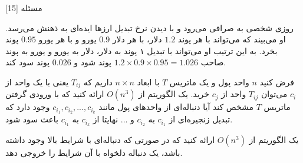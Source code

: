 ‌مسئله [15]

روزی شخصی به صرافی می‌رود و با دیدن نرخ تبدیل ارزها ایده‌ای به ذهنش می‌رسد. او می‌بیند که می‌تواند با هر پوند
$1.2$
دلار، با هر دلار
$0.9$
یورو و با هر یورو
$0.95$
پوند بخرد. به این ترتیب او می‌تواند با تبدیل ۱ پوند به دلار، دلار به یورو و یورو به پوند صاحب
$1.2 \times 0.9 \times 0.95 = 1.026$
پوند شود و 
$0.026$
پوند سود کند.

فرض کنید
$n$
واحد پول و یک ماتریس
$T$
با ابعاد
$n \times n$
داریم که 
$T_{ij}$
یعنی با یک واحد از $c_i$ می‌توان
$T_{ij}$
واحد از
$c_j$
خرید.
یک الگوریتم  از	
$O(n^3)$
ارائه کنید که با ورودی گرفتن ماتریس
$T$
مشخص کند آیا دنباله‌ای از واحدهای پول مانند
$c_{i_1}, c_{i_2}, ..., c_{i_k}$
وجود دارد که تبدیل زنجیره‌ای از
$c_{i_1}$ به $c_{i_2}$
و ...
نهایتا از
$c_{i_k}$ به $c_{i_1}$
باعث سود شود.

یک الگوریتم از
$O(n^3)$
ارائه کنید که در صورتی که دنباله‌ای با شرایط بالا وجود داشته باشد، یک دنباله دلخواه با آن شرایط را خروجی دهد.

% 
%
%
% 



